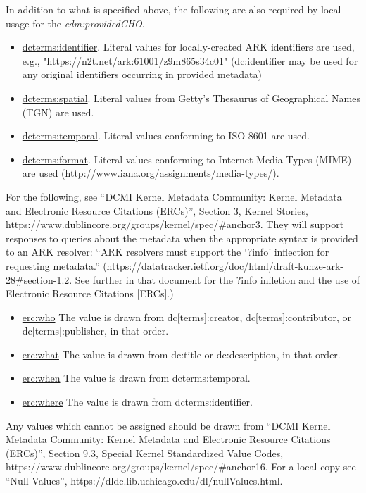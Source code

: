 \documentclass[11pt]{article}
\begin{document}
In addition to what is specified above, the following are also required by local usage for the \textit{edm:providedCHO}.
\begin{itemize}
  \item \underline{dcterms:identifier}. Literal values for locally-created ARK identifiers are used, e.g., "https://n2t.net/ark:61001/z9m865s34c01" (dc:identifier may be used for any original identifiers occurring in provided metadata)

  \item \underline{dcterms:spatial}. Literal values from Getty's Thesaurus of Geographical Names (TGN) are used.

  \item \underline{dcterms:temporal}. Literal values conforming to ISO 8601 are used.

  \item \underline{dcterms:format}. Literal values conforming to Internet Media Types (MIME) are used (http://www.iana.org/assignments/media-types/).

\end{itemize}

For the following, see ``DCMI Kernel Metadata Community: Kernel Metadata and Electronic Resource Citations (ERCs)'', Section 3, Kernel Stories, https://www.dublincore.org/groups/kernel/spec/\#anchor3. They will support responses to queries about the metadata when the appropriate syntax is provided to an ARK resolver: ``ARK resolvers must support the `?info' inflection for requesting metadata.'' (https://datatracker.ietf.org/doc/html/draft-kunze-ark-28\#section-1.2. See further in that document for the ?info infletion and the use of Electronic Resource Citations [ERCs].)

\begin{itemize}
\item \underline{erc:who} The value is drawn from dc[terms]:creator, dc[terms]:contributor, or dc[terms]:publisher, in that order.
\item \underline{erc:what} The value is drawn from dc:title or dc:description, in that order.
\item \underline{erc:when} The value is drawn from dcterms:temporal.
\item \underline{erc:where} The value is drawn from dcterms:identifier.
\end{itemize}

Any values which cannot be assigned should be drawn from ``DCMI Kernel Metadata Community: Kernel Metadata and Electronic Resource Citations (ERCs)'', Section 9.3, Special Kernel Standardized Value Codes, https://www.dublincore.org/groups/kernel/spec/\#anchor16. For a local copy see ``Null Values'', https://dldc.lib.uchicago.edu/dl/nullValues.html.
\end{document}
